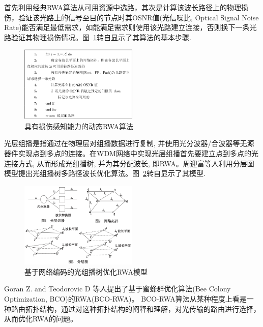 \documentclass[11pt,twocolumn]{ctexart}
\begin{document}
首先利用经典RWA算法从可用资源中选路，其次是计算该波长路径上的物理损伤，验证该光路上的信号至目的节点时其OSNR值(光信噪比, Optical Signal Noise Rate)能否满足最低需求，如能满足需求则使用该光路建立连接，否则换下一条光路验证其物理损伤情况。图~\ref{IRWA}转自\cite{8}显示了其算法的基本步骤.
\begin{figure}[!hbtp]
  \begin{center}
  \includegraphics[width=0.5\textwidth]{IRWA}
  \end{center}
  \caption{具有损伤感知能力的动态RWA算法}
  \label{IRWA}
\end{figure}


光层组播是指通过在物理层对组播数据进行复制, 并使用光分波器/合波器等无源器件实现点到多点的连接。在WDM网络中实现光层组播首先要建立点到多点的光连接方式, 从而形成光组播树, 并为其分配波长, 即RWA。周迎富等人利用分层图模型提出光组播树多路径波长优化算法。图~\ref{MT}转自\cite{8}显示了其模型.
\begin{figure}[!hbtp]
  \begin{center}
  \includegraphics[width=0.5\textwidth]{MT}
  \end{center}
  \caption{基于网络编码的光组播树优化RWA模型}
  \label{MT}
\end{figure}


Goran Z. and Teodorovic D 等人提出了基于蜜蜂群优化算法(Bee Colony Optimization, BCO)的RWA(BCO-RWA)。\cite{6} BCO-RWA算法从某种程度上看是一种路由拓扑结构，通过对这种拓扑结构的阐释和理解，对光传输的路由进行选择，从而优化RWA的问题。
\end{document}
